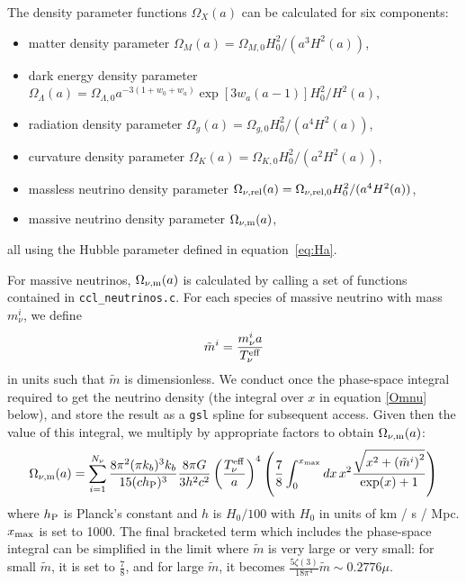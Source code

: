 \documentclass[\docopts]{\docclass}
\begin{document}
The density parameter functions $\Omega_X(a)$ can be calculated for six components:
\begin{itemize}
\item matter density parameter $\Omega_M(a) = \Omega_{M,0} H_0^2 / (a^3 H^2(a) )$,
\item dark energy density parameter $\Omega_\Lambda(a) = \Omega_{\Lambda,0} a^{-3(1+w_0+w_a)} \exp[3 w_a (a-1)] H_0^2 / H^2(a)$,
\item radiation density parameter $\Omega_g(a) = \Omega_{g,0} H_0^2 / (a^4 H^2(a) )$,
\item curvature density parameter $\Omega_K(a) = \Omega_{K,0} H_0^2 / (a^2 H^2(a) )$,
\item massless neutrino density parameter $\Omega_{\nu, {\rm rel}}(a) = \Omega_{\nu, {\rm rel},0} H_0^2 / (a^4 H^2(a) )$,
\item massive neutrino density parameter $\Omega_{\nu, {\rm m}}(a)$,
\end{itemize}
all using the Hubble parameter defined in equation~\ref{eq:Ha}.

For massive neutrinos, $\Omega_{\nu, {\rm m}}(a)$ is calculated by calling a set of functions contained in {\tt ccl\_neutrinos.c}. For each species of massive neutrino with mass $m_\nu^i$, we define
\begin{equation}
\tilde{m}^i = \frac{m_{\nu}^{i}a}{T_{\nu}^{\rm eff}}
\label{mnuOT}
\end{equation}
in units such that $\tilde{m}$ is dimensionless. We conduct once the phase-space integral required to get the neutrino density (the integral over $x$ in equation \ref{Omnu} below), and store the result as a {\tt gsl} spline for subsequent access. Given then the value of this integral, we multiply by appropriate factors to obtain $\Omega_{\nu, {\rm m}}(a)$:
\begin{equation}
\Omega_{\nu, {\rm m}}(a) = \sum_{i=1}^{N_\nu} \frac{8 \pi^2(\pi k_b )^3 k_b}{15(c h_{\rm P})^3} \frac{8 \pi G}{3h^2c^2} \left(\frac{T_{\nu}^{\rm eff}}{a}\right)^4 \left(\frac{7}{8}\int_0^{x_{\rm max}} dx \, x^2 \frac{\sqrt{x^2 + \left(\tilde{m}^i\right)^2}}{\exp(x) + 1}\right)
\label{Omnu}
\end{equation}
where $h_{\rm P}$ is Planck's constant and $h$ is $H_0/100$ with $H_0$ in units of km / s / Mpc. $x_{\rm max}$ is set to 1000. The final bracketed term which includes the phase-space integral can be simplified in the limit where $\tilde{m}$ is very large or very small: for small $\tilde{m}$, it is set to $\frac{7}{8}$, and for large $\tilde{m}$, it becomes $\frac{5\zeta(3)}{18\pi^4}\tilde{m}\sim 0.2776\mu$.
\end{document}
